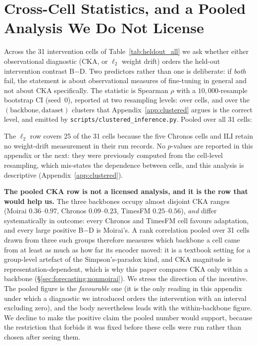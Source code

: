 \section{Cross-Cell Statistics, and a Pooled Analysis We Do Not License}
\label{app:crosscell}

Across the 31 intervention cells of Table~\ref{tab:heldout_all} we ask whether
either observational diagnostic (CKA, or $\ell_2$ weight drift) orders the
held-out intervention contrast B$-$D. Two predictors rather than one is
deliberate: if \emph{both} fail, the statement is about observational measures
of fine-tuning in general and not about CKA specifically. The statistic is
Spearman $\rho$ with a $10{,}000$-resample bootstrap CI (seed~$0$), reported at
two resampling levels: over cells, and over the $(\text{backbone},
\text{dataset})$ clusters that Appendix~\ref{app:clustered} argues is the correct
level, and emitted by \texttt{scripts/clustered\_inference.py}. Pooled over all
31 cells:



\noindent The $\ell_2$ row covers 25 of the 31 cells because the five Chronos
cells and ILI retain no weight-drift measurement in their run records. No
$p$-values are reported in this appendix or the next: they were previously
computed from the cell-level resampling, which mis-states the dependence between
cells, and this analysis is descriptive (Appendix~\ref{app:clustered}).

\textbf{The pooled CKA row is not a licensed analysis, and it is the row that
would help us.} The three backbones occupy almost disjoint CKA ranges (Moirai
$0.36$--$0.97$, Chronos $0.09$--$0.23$, TimesFM $0.25$--$0.56$), \emph{and}
differ systematically in outcome: every Chronos and TimesFM cell favours
adaptation, and every large positive B$-$D is Moirai's. A rank
correlation pooled over 31 cells drawn from three such groups therefore
measures which backbone a cell came from at least as much as how far its
encoder moved: it is a textbook setting for a group-level artefact of the
Simpson's-paradox kind, and CKA magnitude is representation-dependent, which is
why this paper compares CKA only within a backbone
(\S\ref{sec:forecasting:nonmoirai}). We stress the direction of the incentive.
The pooled figure is the \emph{favourable} one (it is the only reading in this
appendix under which a diagnostic we introduced orders the intervention with an
interval excluding zero), and the body nevertheless leads with the
within-backbone figure. We decline to make the positive claim the pooled number
would support, because the restriction that forbids it was fixed before these
cells were run rather than chosen after seeing them.

